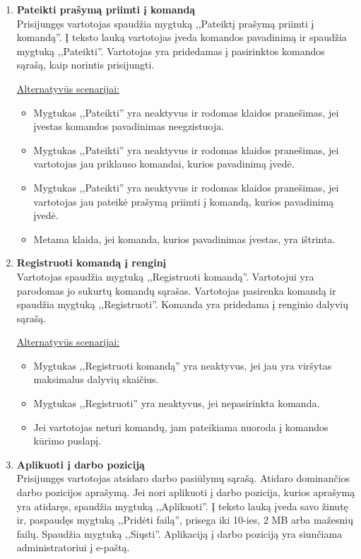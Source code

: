 \documentclass{VUMIFPSkursinis}
\begin{document}
\begin{enumerate} [label = \textbf{U\arabic*.}]
			\item \textbf{Pateikti prašymą priimti į komandą} \\
				Prisijungęs vartotojas spaudžia mygtuką ,,Pateiktį prašymą priimti į komandą''. Į teksto lauką vartotojas įveda komandos pavadinimą ir spaudžia mygtuką ,,Pateikti''. Vartotojas yra pridedamas į pasirinktos komandos sąrašą, kaip norintis prisijungti.
				
				\underline{Alternatyvūs scenarijai:}
				\begin{itemize}
					\item Mygtukas ,,Pateikti'' yra neaktyvus ir rodomas klaidos pranešimas, jei įvestas komandos pavadinimas neegzistuoja.
					\item Mygtukas ,,Pateikti'' yra neaktyvus ir rodomas klaidos pranešimas, jei vartotojas jau priklauso komandai, kurios pavadinimą įvedė.
					\item Mygtukas ,,Pateikti'' yra neaktyvus ir rodomas klaidos pranešimas, jei vartotojas jau pateikė prašymą priimti į komandą, kurios pavadinimą įvedė.
					\item Metama klaida, jei komanda, kurios pavadinimas įvestas, yra ištrinta.
				\end{itemize}
				
			\item \textbf{Registruoti komandą į renginį} \\
				Vartotojas spaudžia mygtuką ,,Registruoti komandą''. Vartotojui yra parodomas jo sukurtų komandų sąrašas. Vartotojas pasirenka komandą ir spaudžia mygtuką ,,Registruoti''. Komanda yra pridedama į renginio dalyvių sąrašą.
				
				\underline{Alternatyvūs scenarijai:}
				\begin{itemize}
					\item Mygtukas ,,Registruoti komandą'' yra neaktyvus, jei jau yra viršytas maksimalus dalyvių skaičius.
					\item Mygtukas ,,Registruoti'' yra neaktyvus, jei nepasirinkta komanda.
					\item Jei vartotojas neturi komandų, jam pateikiama nuoroda į komandos kūrimo puslapį.
				\end{itemize}
				
			\item \textbf{Aplikuoti į darbo poziciją} \\
				Prisijungęs vartotojas atsidaro darbo pasiūlymų sąrašą. Atidaro dominančios darbo pozicijos aprašymą. Jei nori aplikuoti į darbo pozicija, kurios aprašymą yra atidaręs, spaudžia mygtuką ,,Aplikuoti''. Į teksto lauką įveda savo žinutę ir, paspaudęs mygtuką ,,Pridėti failą'', prisega iki 10-ies, 2 MB arba mažesnių failų. Spaudžia mygtuką ,,Siųsti''. Aplikaciją į darbo poziciją yra siunčiama administratoriui į e-paštą.
				

\end{enumerate}
\end{document}
